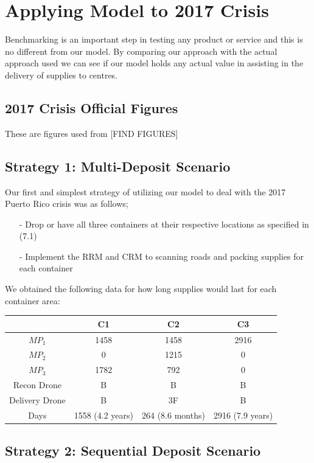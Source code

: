 \documentclass[a4paper,12pt]{article}
\begin{document}
\newpage

\section{Applying Model to 2017 Crisis}
Benchmarking is an important step in testing any product or service and this is no different from our model. By comparing our approach with the actual approach used we can see if our model holds any actual value in assisting
in the delivery of supplies to centres.

\subsection{2017 Crisis Official Figures}
These are figures used from [FIND FIGURES]
\subsection{Strategy 1: Multi-Deposit Scenario}
Our first and simplest strategy of utilizing our model to deal with the 2017 Puerto Rico crisis was as follows;

\begin{itemize}
\item[-]Drop or have all three containers at their respective locations as specified in (7.1)
\item[-]Implement the RRM and CRM to scanning roads and packing supplies for each container
\end{itemize}

We obtained the following data for how long supplies would last for each container area:

\begin{center}
\begin{tabular}{ |c|c|c|c| }
 \hline
  & C1 & C2 & C3 \\\hline
  $MP_1$ & 1458 & 1458 & 2916 \\
  $MP_2$ & 0 & 1215 & 0  \\
  $MP_3$ & 1782 & 792 & 0 \\
  Recon Drone & B & B & B \\
  Delivery Drone & B & 3F & B \\
  Days & 1558 (4.2 years) & 264 (8.6 months) & 2916 (7.9 years) \\
 \hline
\end{tabular}
\end{center}

\subsection{Strategy 2: Sequential Deposit Scenario}
\end{document}
